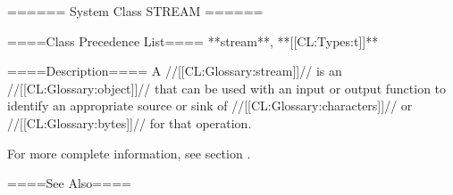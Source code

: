 ====== System Class STREAM ======

====Class Precedence List==== 
**stream**, **[[CL:Types:t]]**

====Description====
A //[[CL:Glossary:stream]]// is an //[[CL:Glossary:object]]// that can be used with an input or output function to identify an appropriate source or sink of //[[CL:Glossary:characters]]// or //[[CL:Glossary:bytes]]// for that operation.

For more complete information, see section {\secref\StreamConcepts}.

====See Also====
{\secref\StreamConcepts}
{\secref\PrintingOtherObjects}
{\chapref\Printer}
{\chapref\Reader}

